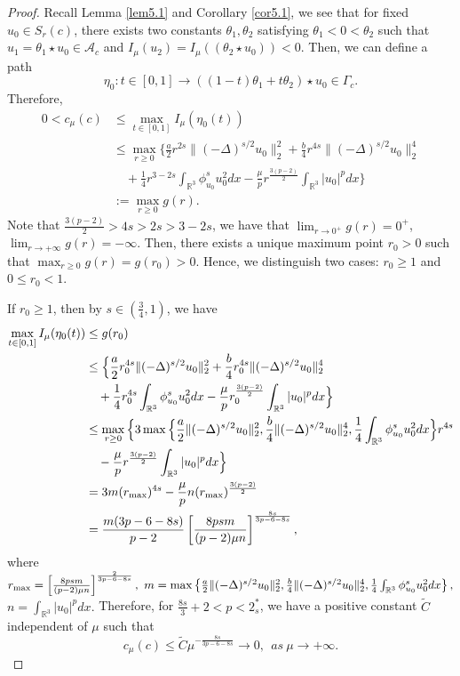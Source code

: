 \begin{proof} 
Recall Lemma {\ref{lem5.1}} and Corollary {\ref{cor5.1}}, we see that for fixed 
$u_0\in S_{r}(c)$, there exists two constants
$\theta_1, \theta_2$ satisfying $\theta_1<0< \theta_2$ such that 
$u_1=\theta_1 \star u_0 \in \mathcal{A}_c$ and 
$I_\mu(u_2)=I_\mu((\theta_2 \star u_0 ))<0$. Then, we can define a path
$$
\eta_0: t \in [0,1]\to ((1-t)\theta_1+t \theta_2)\star u_0 \in \Gamma_c.
$$
Therefore,
\begin{align*}
0<c_\mu(c)
&\leq  \max_{t\in[0,1]} I_\mu(\eta_0(t))\\
&\leq  \max_{r\geq 0} \Big\{\frac{a}{2}r^{2s}\|(-\Delta)^{s/2}u_0\|^2_2+\frac{b}{4}r^{4s}\|(-\Delta)^{s/2}u_0\|^4_2\\
&\quad +\frac{1}{4}r^{3-2s}\int_{\mathbb{R}^3}\phi^s_{u_0}u^2_0dx
 -\frac{\mu}{p}r^{\frac{3(p-2)}{2}}\int_{\mathbb{R}^3}|u_0|^pdx\Big\}\\
&:=\max_{r\geq 0}g(r).
\end{align*}
Note that $\frac{3(p-2)}{2}>4s>2s>3-2s$, we have that $\lim_{r\to 0^+}g(r)=0^+$, 
$\lim_{r\to +\infty}g(r)=-\infty$. Then, there exists a unique maximum point $r_0>0$ 
such that $\max_{r\geq 0}g(r)=g(r_0)>0$. Hence, we distinguish two cases: $r_0\geq1$ 
and $0 \leq r_0<1$.

If $r_0\geq1$, then by $s\in(\frac{3}{4}, 1)$, we have
\begin{align*}
\max_{t\in[0,1]} I_\mu(\eta_0(t))&\leq  g(r_0)\\
&\leq  \Big\{\frac{a}{2}r^{4s}_0\|(-\Delta)^{s/2}u_0\|^2_2
 +\frac{b}{4}r^{4s}_0\|(-\Delta)^{s/2}u_0\|^4_2\\
&\quad +\frac{1}{4}r^{4s}_0\int_{\mathbb{R}^3}\phi^s_{u_0}u^2_0dx
 -\frac{\mu}{p}r^{\frac{3(p-2)}{2}}_0\int_{\mathbb{R}^3}|u_0|^pdx\Big\}\\
&\leq  \max_{r\geq 0}\Big\{3\max\Big\{\frac{a}{2}\|(-\Delta)^{s/2}u_0\|^2_2, 
 \frac{b}{4}\|(-\Delta)^{s/2}u_0\|^4_2,
 \frac{1}{4}\int_{\mathbb{R}^3}\phi^s_{u_0}u^2_0dx  \Big\}r^{4s}\\
&\quad -\frac{\mu}{p}r^{\frac{3(p-2)}{2}}\int_{\mathbb{R}^3}|u_0|^pdx\Big\}\\
&= 3m(r_{\rm max})^{4s}-\frac{\mu}{p}n(r_{\rm max})^{\frac{3(p-2)}{2}}\\
&= \frac{m(3p-6-8s)}{p-2}\left[\frac{8psm}{(p-2)\mu n}\right]^{\frac{8s}{3p-6-8s}},
\end{align*}
where $r_{\rm max}=\left[\frac{8psm}{(p-2)\mu n}\right]^{\frac{2}{3p-6-8s}}, 
~m=\max\left\{\frac{a}{2}\|(-\Delta)^{s/2}u_0\|^2_2, \frac{b}{4}\|(-\Delta)^{s/2}u_0\|^4_2,
\frac{1}{4}\int_{\mathbb{R}^3}\phi^s_{u_0}u^2_0dx  \right\},$ $n=\int_{\mathbb{R}^3}|u_0|^pdx.$
Therefore, for $\frac{8s}{3}+2<p<2^*_s$, we have a positive constant $\tilde{C}$ independent of $\mu$ such that
$$c_\mu (c)\leq \tilde{C}{\mu}^{-\frac{8s}{3p-6-8s}}\to 0, ~~as~\mu\to +\infty.$$



\end{proof}

